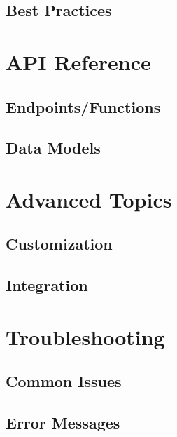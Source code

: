 \documentclass[a4paper,12pt]{article} %
\begin{document}
    \subsection{Best Practices}


    \section{API Reference}

    \subsection{Endpoints/Functions}

    \subsection{Data Models}


    \section{Advanced Topics}

    \subsection{Customization}

    \subsection{Integration}


    \section{Troubleshooting}

    \subsection{Common Issues}

    \subsection{Error Messages}
\end{document}
